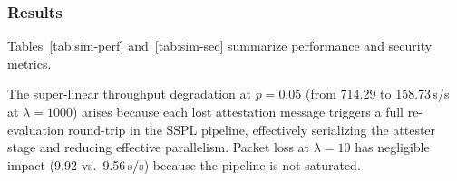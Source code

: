 \documentclass[journal]{IEEEtran}
\begin{document}
\subsubsection{Results}
Tables~\ref{tab:sim-perf} and~\ref{tab:sim-sec} summarize
performance and security metrics.

The super-linear throughput degradation at $p = 0.05$ (from 714.29
to 158.73\,s/s at $\lambda = 1000$) arises because each lost
attestation message triggers a full re-evaluation round-trip in the
SSPL pipeline, effectively serializing the attester stage and
reducing effective parallelism.
Packet loss at $\lambda = 10$ has negligible impact (9.92 vs.\
9.56\,s/s) because the pipeline is not saturated.

\begin{table}[h]
\centering
\caption{Simulation: performance metrics (VALID\_SIMULATION\_ONLY)}
\label{tab:sim-perf}
\end{table}

\begin{table}[h]
\centering
\caption{Simulation: security metrics (VALID\_SIMULATION\_ONLY)}
\label{tab:sim-sec}
\end{table}
\end{document}
